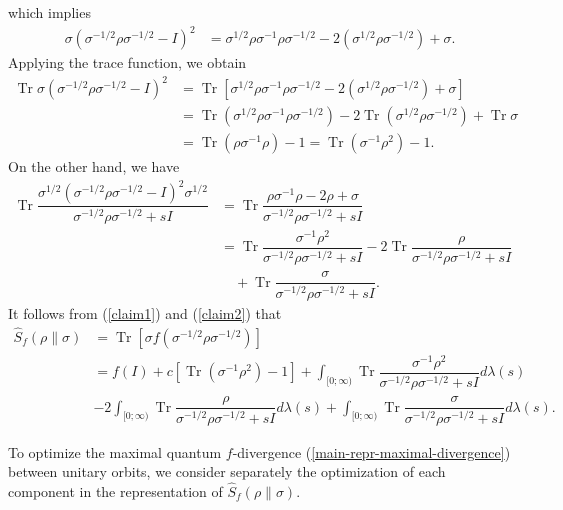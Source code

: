 \documentclass[10pt,reqno]{amsart}
\theoremstyle{break-italic}
\theoremstyle{break-italic}
\theoremstyle{break-italic}
\theoremstyle{break-italic}
\theoremstyle{break-italic}
\theoremstyle{break-italic}
\theoremstyle{break-italic}
\theoremstyle{break-italic}
\theoremstyle{break-roman}
\theoremstyle{standard}
\theoremstyle{varthm-roman}
\theoremstyle{varthm-italic}
\theoremstyle{varthm-roman-break}
\theoremstyle{varthm-italic-break}
\theoremstyle{varthm-roman-no-punctuation}
\theoremstyle{varthm-italic-no-punctuation}
\numberwithin{equation}{section}
\begin{document}
which implies
\begin{align*}
\sigma  \left(\sigma^{-1/2}\rho\sigma^{-1/2}-I\right)^2 &= \sigma^{1/2} \rho\sigma^{-1}\rho\sigma^{-1/2} - 2\left(\sigma^{1/2}\rho\sigma^{-1/2}\right) + \sigma.
\end{align*}
Applying the trace function, we obtain
\begin{align*}
\operatorname{Tr} \sigma  \left(\sigma^{-1/2}\rho\sigma^{-1/2}-I\right)^2&= \operatorname{Tr} \left[\sigma^{1/2} \rho\sigma^{-1}\rho\sigma^{-1/2} - 2\left(\sigma^{1/2}\rho\sigma^{-1/2}\right) + \sigma\right]\\
&=\operatorname{Tr}\left(\sigma^{1/2} \rho\sigma^{-1}\rho\sigma^{-1/2}\right) - 2\operatorname{Tr}\left(\sigma^{1/2}\rho\sigma^{-1/2}\right) + \operatorname{Tr}\sigma\\
&=\operatorname{Tr}\left(\rho\sigma^{-1}\rho\right) -1 = \operatorname{Tr}\left(\sigma^{-1}\rho^2\right)-1.
\end{align*}
On the other hand, we have
\begin{align}\label{claim2}
\operatorname{Tr}\dfrac{\sigma^{1/2}\left(\sigma^{-1/2}\rho\sigma^{-1/2}-I\right)^2\sigma^{1/2}}{\sigma^{-1/2}\rho\sigma^{-1/2}+sI} &= \operatorname{Tr}\dfrac{\rho\sigma^{-1}\rho-2\rho+\sigma}{\sigma^{-1/2}\rho\sigma^{-1/2}+sI}\nonumber\\
&=\operatorname{Tr}\dfrac{\sigma^{-1}\rho^2}{\sigma^{-1/2}\rho\sigma^{-1/2}+sI}-2\operatorname{Tr}\dfrac{\rho}{\sigma^{-1/2}\rho\sigma^{-1/2}+sI}\nonumber\\
&\quad+\operatorname{Tr}\dfrac{\sigma}{\sigma^{-1/2}\rho\sigma^{-1/2}+sI}.
\end{align}
It follows from (\ref{claim1}) and (\ref{claim2}) that 
\begin{align}\label{main-repr-maximal-divergence}
\widehat{S}_f(\rho\|\sigma)&=\operatorname{Tr}\left[\sigma f\left(\sigma^{-1/2}\rho\sigma^{-1/2}\right)\right]\nonumber\\
&=f(I)+c\left[\operatorname{Tr}\left(\sigma^{-1}\rho^2\right)-1\right]+\int_{[0;\infty)} \operatorname{Tr}\dfrac{\sigma^{-1}\rho^2}{\sigma^{-1/2}\rho\sigma^{-1/2}+sI}d\lambda(s)\\
&-2\int_{[0;\infty)}\operatorname{Tr}\dfrac{\rho}{\sigma^{-1/2}\rho\sigma^{-1/2}+sI}d\lambda(s)  +\int_{[0;\infty)}\operatorname{Tr}\dfrac{\sigma}{\sigma^{-1/2}\rho\sigma^{-1/2}+sI}d\lambda(s). \nonumber
\end{align}

To optimize the maximal quantum $f$-divergence (\ref{main-repr-maximal-divergence}) between unitary orbits, we consider separately the optimization of each component in the representation of $\widehat{S}_f(\rho\|\sigma)$.
\end{document}
